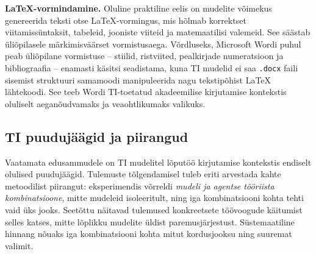 \textbf{LaTeX-vormindamine.} Oluline praktiline eelis on mudelite võimekus genereerida teksti otse LaTeX-vormingus, mis hõlmab korrektset viitamissüntaksit, tabeleid, jooniste viiteid ja matemaatilisi valemeid. See säästab üliõpilasele märkimisväärset vormistusaega. Võrdluseks, Microsoft Wordi puhul peab üliõpilane vormistuse -- stiilid, ristviited, pealkirjade numeratsioon ja bibliograafia -- enamasti käsitsi seadistama, kuna TI mudelid ei saa \texttt{.docx} faili sisemist struktuuri samamoodi manipuleerida nagu tekstipõhist \LaTeX{} lähtekoodi. See teeb Wordi TI-toetatud akadeemilise kirjutamise kontekstis oluliselt aeganõudvamaks ja veaohtlikumaks valikuks.

\subsection{TI puudujäägid ja piirangud} \label{subsec:puudujaagid}

Vaatamata edusammudele on TI mudelitel lõputöö kirjutamise kontekstis endiselt olulised puudujäägid. Tulemuste tõlgendamisel tuleb eriti arvestada kahte metoodilist piirangut: eksperimendis võrreldi \emph{mudeli ja agentse tööriista kombinatsioone}, mitte mudeleid isoleeritult, ning iga kombinatsiooni kohta tehti vaid üks jooks. Seetõttu näitavad tulemused konkreetsete töövoogude käitumist selles katses, mitte lõplikku mudelite üldist paremusjärjestust. Süstemaatiline hinnang nõuaks iga kombinatsiooni kohta mitut kordusjooksu ning suuremat valimit.

